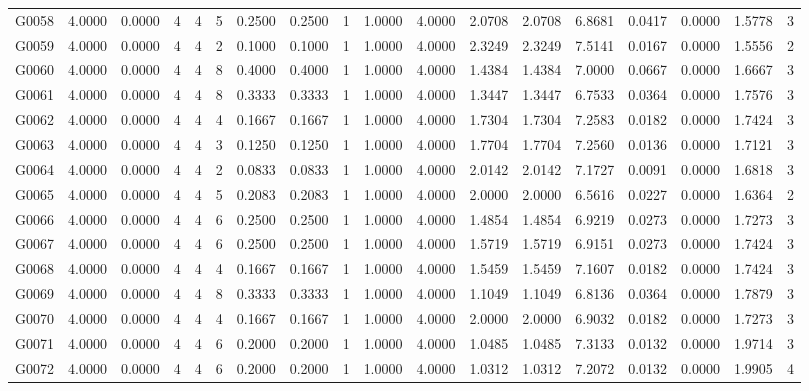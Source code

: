 \begin{tabular}{lrrrrrrrrrrrrrrrrr}
G0058 & 4.0000 & 0.0000 & 4 & 4 & 5 & 0.2500 & 0.2500 & 1 & 1.0000 & 4.0000 & 2.0708 & 2.0708 & 6.8681 & 0.0417 & 0.0000 & 1.5778 & 3 \\
G0059 & 4.0000 & 0.0000 & 4 & 4 & 2 & 0.1000 & 0.1000 & 1 & 1.0000 & 4.0000 & 2.3249 & 2.3249 & 7.5141 & 0.0167 & 0.0000 & 1.5556 & 2 \\
G0060 & 4.0000 & 0.0000 & 4 & 4 & 8 & 0.4000 & 0.4000 & 1 & 1.0000 & 4.0000 & 1.4384 & 1.4384 & 7.0000 & 0.0667 & 0.0000 & 1.6667 & 3 \\
G0061 & 4.0000 & 0.0000 & 4 & 4 & 8 & 0.3333 & 0.3333 & 1 & 1.0000 & 4.0000 & 1.3447 & 1.3447 & 6.7533 & 0.0364 & 0.0000 & 1.7576 & 3 \\
G0062 & 4.0000 & 0.0000 & 4 & 4 & 4 & 0.1667 & 0.1667 & 1 & 1.0000 & 4.0000 & 1.7304 & 1.7304 & 7.2583 & 0.0182 & 0.0000 & 1.7424 & 3 \\
G0063 & 4.0000 & 0.0000 & 4 & 4 & 3 & 0.1250 & 0.1250 & 1 & 1.0000 & 4.0000 & 1.7704 & 1.7704 & 7.2560 & 0.0136 & 0.0000 & 1.7121 & 3 \\
G0064 & 4.0000 & 0.0000 & 4 & 4 & 2 & 0.0833 & 0.0833 & 1 & 1.0000 & 4.0000 & 2.0142 & 2.0142 & 7.1727 & 0.0091 & 0.0000 & 1.6818 & 3 \\
G0065 & 4.0000 & 0.0000 & 4 & 4 & 5 & 0.2083 & 0.2083 & 1 & 1.0000 & 4.0000 & 2.0000 & 2.0000 & 6.5616 & 0.0227 & 0.0000 & 1.6364 & 2 \\
G0066 & 4.0000 & 0.0000 & 4 & 4 & 6 & 0.2500 & 0.2500 & 1 & 1.0000 & 4.0000 & 1.4854 & 1.4854 & 6.9219 & 0.0273 & 0.0000 & 1.7273 & 3 \\
G0067 & 4.0000 & 0.0000 & 4 & 4 & 6 & 0.2500 & 0.2500 & 1 & 1.0000 & 4.0000 & 1.5719 & 1.5719 & 6.9151 & 0.0273 & 0.0000 & 1.7424 & 3 \\
G0068 & 4.0000 & 0.0000 & 4 & 4 & 4 & 0.1667 & 0.1667 & 1 & 1.0000 & 4.0000 & 1.5459 & 1.5459 & 7.1607 & 0.0182 & 0.0000 & 1.7424 & 3 \\
G0069 & 4.0000 & 0.0000 & 4 & 4 & 8 & 0.3333 & 0.3333 & 1 & 1.0000 & 4.0000 & 1.1049 & 1.1049 & 6.8136 & 0.0364 & 0.0000 & 1.7879 & 3 \\
G0070 & 4.0000 & 0.0000 & 4 & 4 & 4 & 0.1667 & 0.1667 & 1 & 1.0000 & 4.0000 & 2.0000 & 2.0000 & 6.9032 & 0.0182 & 0.0000 & 1.7273 & 3 \\
G0071 & 4.0000 & 0.0000 & 4 & 4 & 6 & 0.2000 & 0.2000 & 1 & 1.0000 & 4.0000 & 1.0485 & 1.0485 & 7.3133 & 0.0132 & 0.0000 & 1.9714 & 3 \\
G0072 & 4.0000 & 0.0000 & 4 & 4 & 6 & 0.2000 & 0.2000 & 1 & 1.0000 & 4.0000 & 1.0312 & 1.0312 & 7.2072 & 0.0132 & 0.0000 & 1.9905 & 4 \\

\end{tabular}
